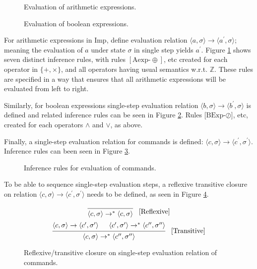 \begin{figure}[htb]

\caption{Evaluation of arithmetic expressions.}
\label{infer-arith}
\end{figure}
\begin{figure}[htb]

\caption{Evaluation of boolean expressions.}
\label{infer-bool}
\end{figure}

For arithmetic expressions in Imp, define evaluation relation $\langle a, \sigma \rangle \rightarrow \langle a^\prime, \sigma  \rangle$; meaning the evaluation of $a$ under state $\sigma$ in single step yields $a^\prime$. Figure \ref{infer-arith} shows seven distinct inference rules, with rules $[\text{Aexp-}\oplus]$, etc created for each operator in $\{+, \times \}$, and all operators having usual semantics w.r.t. $\mathbb{Z}$. These rules are specified in a way that ensures that all arithmetic expressions will be evaluated from left to right.


Similarly, for boolean expressions single-step evaluation relation $\langle b, \sigma \rangle \rightarrow \langle b^\prime, \sigma  \rangle$ is defined and related inference rules can be seen in Figure \ref{infer-bool}. Rules [$\text{BExp-}\oslash]$, etc, created for each operators $\land$ and $\lor$, as above.

Finally, a single-step evaluation relation for commands is defined: $\langle c, \sigma \rangle \rightarrow \langle c^\prime, \sigma^\prime \rangle$. Inference rules can been seen in Figure \ref{infer-comm}.

\begin{figure}[htb]

\caption{Inference rules for evaluation of commands.}
\label{infer-comm}
\end{figure}

To be able to sequence single-step evaluation steps, a reflexive transitive closure on relation $\langle c, \sigma \rangle \rightarrow \langle c^\prime, \sigma^\prime \rangle$ needs to be defined, as seen in Figure \ref{transitive-closure}.

\begin{figure}[htb]
\[
\begin{prooftree}
\infer0{
	\langle c, \sigma \rangle 
	\rightarrow^{*} \langle 
	c, \sigma \rangle
}
\end{prooftree} \; \; \; [\text{Reflexive}]
\]
\[
\begin{prooftree}
\hypo{
	\langle c, \sigma \rangle \rightarrow \langle c^\prime, \sigma^\prime \rangle
} 
\hypo{
	\langle c^\prime, \sigma^\prime \rangle \rightarrow^{*} \langle c^{\prime\prime}, \sigma^{\prime\prime} \rangle
}
\infer2{
	\langle c, \sigma \rangle \rightarrow^{*} \langle c^{\prime\prime}, \sigma^{\prime\prime} \rangle
}
\end{prooftree} \; \; \; [\text{Transitive}]
\]
\caption{Reflexive/transitive closure on single-step evaluation relation of commands.}
\label{transitive-closure}
\end{figure}


